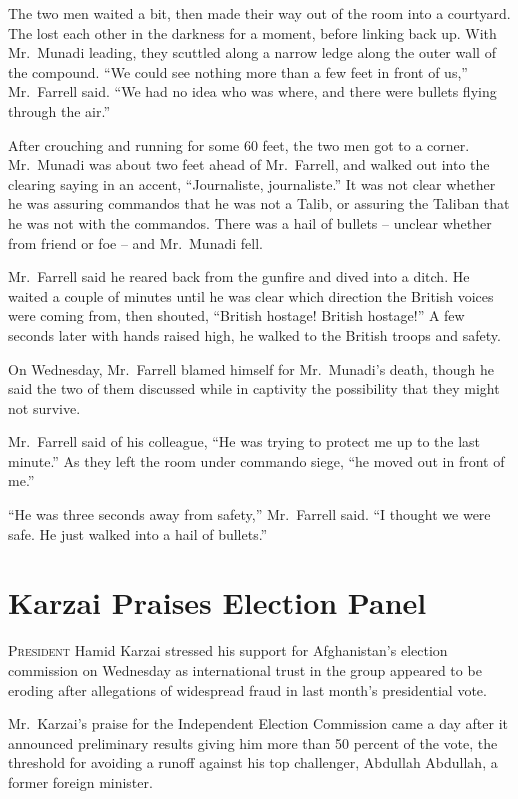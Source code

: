 ﻿\documentclass[12pt]{article}
\begin{document}
The two men waited a bit, then made their way out of the room into a courtyard. The lost each other
in the darkness for a moment, before linking back up. With Mr.~Munadi leading, they scuttled along a
narrow ledge along the outer wall of the compound. ``We could see nothing more than a few feet in
front of us,'' Mr.~Farrell said. ``We had no idea who was where, and there were bullets flying
through the air.''

After crouching and running for some 60 feet, the two men got to a corner. Mr.~Munadi was about two
feet ahead of Mr.~Farrell, and walked out into the clearing saying in an accent, ``Journaliste,
journaliste.'' It was not clear whether he was assuring commandos that he was not a Talib, or
assuring the Taliban that he was not with the commandos. There was a hail of bullets -- unclear
whether from friend or foe -- and Mr.~Munadi fell.

Mr.~Farrell said he reared back from the gunfire and dived into a ditch. He waited a couple of
minutes until he was clear which direction the British voices were coming from, then shouted,
``British hostage! British hostage!'' A few seconds later with hands raised high, he walked to the
British troops and safety.

On Wednesday, Mr.~Farrell blamed himself for Mr.~Munadi's death, though he said the two of them
discussed while in captivity the possibility that they might not survive.

Mr.~Farrell said of his colleague, ``He was trying to protect me up to the last minute.'' As they
left the room under commando siege, ``he moved out in front of me.''

``He was three seconds away from safety,'' Mr.~Farrell said. ``I thought we were safe. He just
walked into a hail of bullets.''

\section{Karzai Praises Election Panel}

\lettrine{P}{resident} Hamid Karzai stressed his support for Afghanistan's election commission on
Wednesday as international trust in the group appeared to be eroding after allegations of widespread
fraud in last month's presidential vote.

Mr.~Karzai's praise for the Independent Election Commission came a day after it announced
preliminary results giving him more than 50 percent of the vote, the threshold for avoiding a runoff
against his top challenger, Abdullah Abdullah, a former foreign minister.
\end{document}
